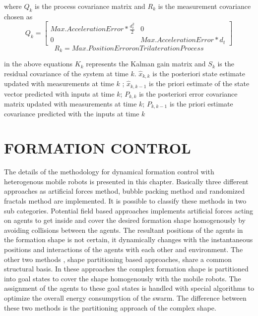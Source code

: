 \documentclass[twoside]{article}
\begin{document}
		
		where $Q_k$ is the process covariance matrix and $R_k$ is the measurement covariance chosen as 
		\begin{equation}
Q_k = \begin{bmatrix}
Max. Acceleration Error * \frac{d^2_t}{2} & 0 \\
0 & Max. Acceleration Error * d_t
\end{bmatrix}
		\end{equation}
		\begin{equation}
R_k = Max. Position Error on Trilateration Process
		\end{equation}
		
	in the above equations $K_k$ represents the Kalman gain matrix and $S_k$ is the residual covariance of the system at time $k$. $\hat{x}_{k,k}$ is the posteriori state estimate updated with measurements at time $k$ ;  $\hat{x}_{k,k-1}$ is the priori estimate of the state vector predicted with inputs at time $k$; $P_{k,k}$ is the posteriori error covariance matrix updated with measurements at time $k$; $P_{k,k-1}$ is the priori estimate covariance predicted with the inputs at time $k$
		
		
\section{FORMATION CONTROL}		
  The details of the methodology for dynamical formation control with heterogenous mobile robots is presented in this chapter. Basically three different approaches as artificial forces method, bubble packing method and randomized fractals method are implemented. It is possible to classify these methods in two sub categories. Potential field based approaches implements artificial forces acting on agents to get inside and cover the desired formation shape homogenously by avoiding collisions between the agents. The resultant positions of the agents in the formation shape is not certain, it dynamically changes with the instantaneous positions and interactions of the agents with each other and environment. The other two methods , shape partitioning based approaches, share a common structural basis. In these approaches the complex formation shape is partitioned into goal states to cover the shape homogenously with the mobile robots. The assignment of the agents to these goal states is handled with special algorithms to optimize the overall energy consumpytion of the swarm. The difference between these two methods is the partitioning approach of the complex shape. 
		
\end{document}
